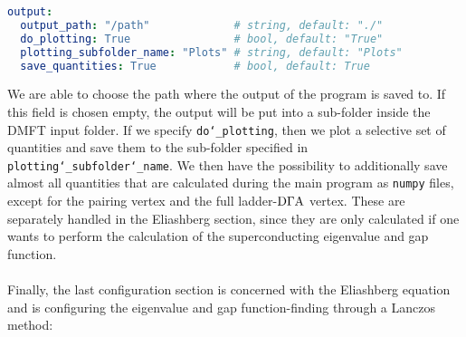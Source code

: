 \documentclass[../../main.tex]{subfiles}
\begin{document}
\begin{minipage}{\textwidth}%
\begin{lstlisting}[language=yaml]
output:
  output_path: "/path"             # string, default: "./"
  do_plotting: True                # bool, default: "True"
  plotting_subfolder_name: "Plots" # string, default: "Plots"
  save_quantities: True            # bool, default: True
\end{lstlisting}
\end{minipage}
We are able to choose the path where the output of the program is saved to. If this field is chosen empty, the output will be put into a sub-folder inside the DMFT input folder. If we specify \texttt{do\char`_plotting}, then we plot a selective set of quantities and save them to the sub-folder specified in \texttt{plotting\char`_subfolder\char`_name}. We then have the possibility to additionally save almost all quantities that are calculated during the main program as \texttt{numpy} files, except for the pairing vertex and the full ladder-$\text{D}\Gamma\text{A}$ vertex. These are separately handled in the Eliashberg section, since they are only calculated if one wants to perform the calculation of the superconducting eigenvalue and gap function.
\\\\
Finally, the last configuration section is concerned with the Eliashberg equation and is configuring the eigenvalue and gap function-finding through a Lanczos method:
\end{document}
